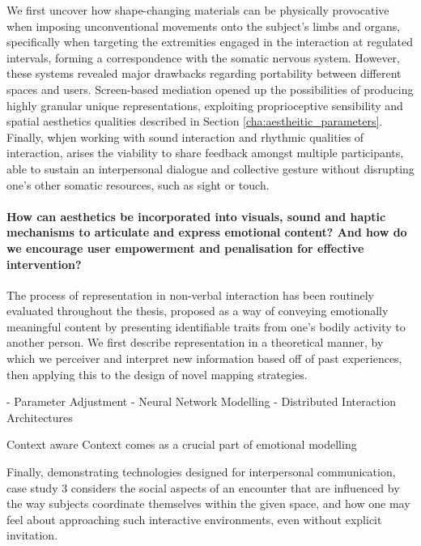 We first uncover how shape-changing materials can be physically provocative when imposing unconventional movements onto the subject's limbs and organs, specifically when targeting the extremities engaged in the interaction at regulated intervals, forming a correspondence with the somatic nervous system. However, these systems revealed major drawbacks regarding portability between different spaces and users. Screen-based mediation opened up the possibilities of producing highly granular unique representations, exploiting proprioceptive sensibility and spatial aesthetics qualities described in Section \ref{cha:aestheitic_parameters}. Finally, whjen working with sound interaction and rhythmic qualities of interaction, arises the viability to share feedback amongst multiple participants, able to sustain an interpersonal dialogue and collective gesture without disrupting one's other somatic resources, such as sight or touch. 

\paragraph{How can aesthetics be incorporated into visuals, sound and haptic mechanisms to articulate and express emotional content? And how do we encourage user empowerment and penalisation for effective intervention?}


    
The process of representation in non-verbal interaction has been routinely evaluated throughout the thesis, proposed as a way of conveying emotionally meaningful content by presenting identifiable traits from one's bodily activity to another person. We first describe representation in a theoretical manner, by which we perceiver and interpret new information based off of past experiences, then applying this to the design of novel mapping strategies.

- Parameter Adjustment
- Neural Network Modelling
- Distributed Interaction Architectures

Context aware
Context comes as a crucial part of emotional modelling

Finally, demonstrating technologies designed for interpersonal communication, case study 3 considers the social aspects of an encounter that are influenced by the way subjects coordinate themselves within the given space, and how one may feel about approaching such interactive environments, even without explicit invitation.

